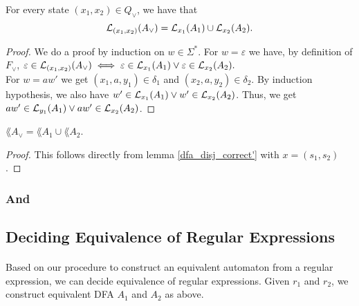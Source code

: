 \begin{lemma}
    \label{dfa_disj_correct'}
    For every state $(x_1, x_2) \in Q_\vee$, we have that
    \begin{equation*}
        \mathcal{L}_{(x_1, x_2)}(A_\vee) = \mathcal{L}_{x_1}(A_1) \cup \mathcal{L}_{x_2}(A_2).
    \end{equation*}
\end{lemma}
\begin{proof}
    We do a proof by induction on $w \in \Sigma^*$.
    For $w = \varepsilon$ we have, by definition of $F_\vee$, 
    $%
    \varepsilon \in \acc{(x_1, x_2)}{A_\vee} 
    \iff \varepsilon \in \acc{x_1}{A_1} \vee \varepsilon \in \acc{x_2}{A_2}.
    $%
    \\
    For $w = aw'$ we get $(x_1, a, y_1) \in \delta_1$ and $(x_2, a, y_2) \in \delta_2$.
    By induction hypothesis, we also have $w' \in \mathcal{L}_{x_1}(A_1) \vee w' \in \mathcal{L}_{x_2}(A_2)$.
    Thus, we get $aw' \in \mathcal{L}_{y_1}(A_1) \vee aw' \in \mathcal{L}_{x_2}(A_2)$.
\end{proof}

\begin{lemma}
    $\lang{A_\vee} = \lang{A_1} \cup \lang{A_2}$.
    \label{dfa_disj_correct}
\end{lemma}
\begin{proof}
    This follows directly from lemma \ref{dfa_disj_correct'} with $x = (s_1, s_2)$.
\end{proof}




\subsubsection{And}



\subsection{Deciding Equivalence of Regular Expressions}

\paragraph{} 
Based on our procedure to construct an equivalent automaton from a regular expression, we can decide equivalence of regular expressions. Given $r_1$ and $r_2$, we construct equivalent DFA $A_1$ and $A_2$ as above.


